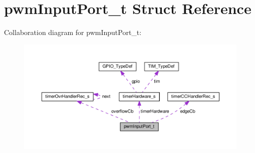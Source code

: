 \hypertarget{structpwmInputPort__t}{\section{pwm\+Input\+Port\+\_\+t Struct Reference}
\label{structpwmInputPort__t}
}


Collaboration diagram for pwm\+Input\+Port\+\_\+t\+:\nopagebreak
\begin{figure}[H]
\begin{center}
\leavevmode
\includegraphics[width=350pt]{structpwmInputPort__t__coll__graph}
\end{center}
\end{figure}
